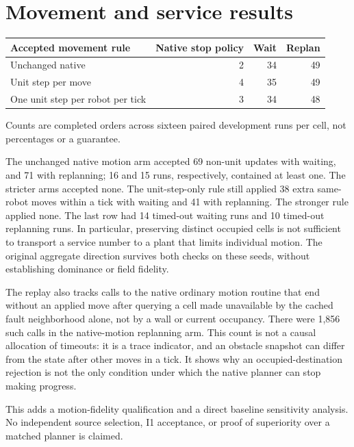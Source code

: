 \documentclass[11pt]{article}
\begin{document}
\section{Movement and service results}

\begin{center}
\begin{tabular}{lrrr}
\toprule
Accepted movement rule & Native stop policy & Wait & Replan\\
\midrule
Unchanged native & 2 & 34 & 49\\
Unit step per move & 4 & 35 & 49\\
One unit step per robot per tick & 3 & 34 & 48\\
\bottomrule
\end{tabular}

Counts are completed orders across sixteen paired development runs
per cell, not percentages or a guarantee.
\end{center}

The unchanged native motion arm accepted 69 non-unit updates
with waiting, and 71 with replanning; 16 and 15 runs,
respectively, contained at least one. The stricter arms accepted
none. The unit-step-only rule still applied 38 extra same-robot
moves within a tick with waiting and 41 with replanning. The
stronger rule applied none. The last row had 14 timed-out
waiting runs and 10 timed-out replanning runs. In particular,
preserving distinct occupied cells is not sufficient to transport
a service number to a plant that limits individual motion.
The original aggregate direction survives both checks on these
seeds, without establishing dominance or field fidelity.

The replay also tracks calls to the native ordinary motion routine
that end without an applied move after querying a cell made
unavailable by the cached fault neighborhood alone, not by a
wall or current occupancy. There were 1,856 such calls in the
native-motion replanning arm. This count is not a causal allocation
of timeouts: it is a trace indicator, and an obstacle snapshot
can differ from the state after other moves in a tick. It shows
why an occupied-destination rejection is not the only condition
under which the native planner can stop making progress.

This adds a motion-fidelity qualification and a direct baseline
sensitivity analysis. No independent source selection, I1 acceptance,
or proof of superiority over a matched planner is claimed.
\end{document}

